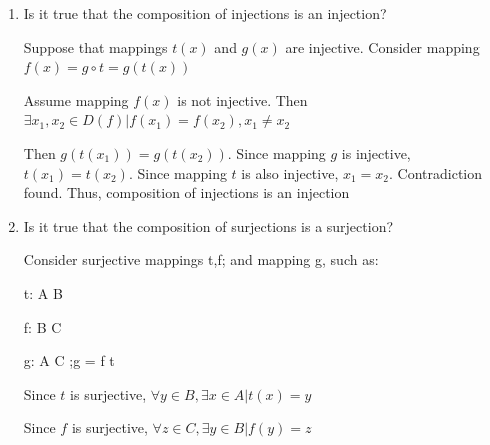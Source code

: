 \documentclass[12pt]{article}
\begin{document}
\begin{enumerate}
b) Find $f^{-1}$ (give a rule according to which, from a string $x$, one obtains the string $f^{-1}(x)$). 


Let $f^-^1$ be inverse mapping of $f$

if $f(x) = 0^n$, then $f^-^1(f(x)) = 1^n$

if $f(x) \not = 0^n$, there is at least one 1 in the string. We find the rightmost 1, change it to 0 and change all zeroes to its right to 1

Consider x = $1^n$. Then $f(x) = 0^n$. Then $f^-^-1(f(x)) = 1^n = x$

Consider $x \not = 1^n$. Then $x = \omega01^k$, k = number of consecutive ones. Then $f(x) = \omega10^k$. Then $f^-^1(f(x)) = \omega01^k = x$. Thus reverse mapping $f^-^1$ is defined for every output of f.


a) If reverse mapping $f^-^1$ exists, f is bijection


















\item Is it true that the composition of injections is an injection?

Suppose that mappings $t(x)$ and $g(x)$ are injective. Consider mapping $f(x) = g \circ t = g(t(x))$

Assume mapping $f(x)$ is not injective. Then $ \exists x_1,x_2 \in D(f) | f(x_1) = f(x_2), x_1 \not = x_2$

Then $g(t(x_1)) = g(t(x_2))$. Since mapping $g$ is injective, $t(x_1) = t(x_2)$. Since mapping $t$ is also injective, $x_1 = x_2$. 
Contradiction found. Thus, composition of injections is an injection


\item Is it true that the composition of surjections is a surjection?

Consider surjective mappings t,f; and mapping g, such as:

t: A \rightarrow B

f: B \rightarrow C

g: A \rightarrow C ;g =  f \circ t

Since $t$ is surjective, $\forall y \in B, \exists x \in A | t(x) = y$

Since $f$ is surjective, $\forall z \in C, \exists y \in B | f(y) = z$


\end{enumerate}
\end{document}
